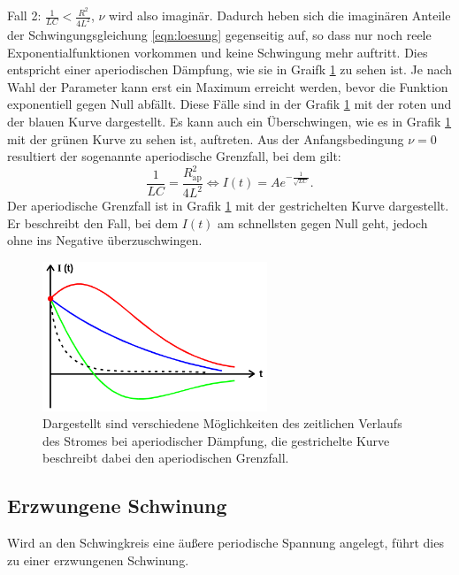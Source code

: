 Fall 2: $\frac{1}{L C} < \frac{R^2}{4L^2}$, $\nu$ wird also imaginär. Dadurch heben
sich die imaginären Anteile der Schwingungsgleichung \eqref{eqn:loesung} gegenseitig
auf, so dass nur noch reele Exponentialfunktionen vorkommen und keine Schwingung
mehr auftritt. Dies entspricht einer aperiodischen Dämpfung, wie sie in Graifk
\ref{fig:ap_grenzfall} zu sehen ist. Je nach Wahl der Parameter kann erst ein Maximum
erreicht werden, bevor die Funktion exponentiell gegen Null abfällt. Diese Fälle
sind in der Grafik \ref{fig:ap_grenzfall} mit der roten und der blauen Kurve
dargestellt. Es kann auch ein Überschwingen, wie es in Grafik \ref{fig:ap_grenzfall}
mit der grünen Kurve zu sehen ist, auftreten.
Aus der Anfangsbedingung $\nu=0$ resultiert der sogenannte aperiodische Grenzfall,
bei dem gilt:
\begin{equation}
  \frac{1}{L C} = \frac{R_{\text{ap}}^2}{4 L^2} \iff I(t) = A e^{-\frac{1}{\sqrt{L C}}}.
  \label{eqn:bedingung-ap-grenzfall}
\end{equation}
Der aperiodische Grenzfall ist in Grafik \ref{fig:ap_grenzfall} mit der gestrichelten
Kurve dargestellt. Er beschreibt den Fall, bei dem $I(t)$ am schnellsten gegen Null
geht, jedoch ohne ins Negative überzuschwingen.
\begin{figure}
  \centering
  \includegraphics[width=0.6\textwidth]{ap_grenzfall.png}
  \caption{Dargestellt sind verschiedene Möglichkeiten des zeitlichen Verlaufs des
  Stromes bei aperiodischer Dämpfung, die gestrichelte Kurve beschreibt dabei den
  aperiodischen Grenzfall\cite{sample}.}
  \label{fig:ap_grenzfall}
\end{figure}

\subsection{Erzwungene Schwinung}
Wird an den Schwingkreis eine äußere periodische Spannung angelegt, führt dies zu
einer erzwungenen Schwinung.
\cite{sample}
